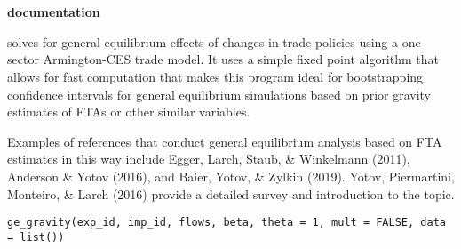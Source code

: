 \documentclass[a4paper]{book}
\begin{document}
\chapter*{}
\begin{center}
{\textbf{\huge \R{} documentation}} \par{}
\par\bigskip{\large \today}
\end{center}
%
\begin{Description}\relax
{} solves for general equilibrium effects of changes in trade policies
using a one sector Armington-CES trade model. It uses a simple fixed point
algorithm that allows for fast computation that makes this program
ideal for bootstrapping confidence intervals for general equilibrium simulations
based on prior gravity estimates of FTAs or other similar variables.

Examples of references that conduct general equilibrium analysis based on FTA
estimates in this way include Egger, Larch, Staub, \& Winkelmann (2011),
Anderson \& Yotov (2016), and Baier, Yotov, \& Zylkin (2019). Yotov, Piermartini,
Monteiro, \& Larch (2016) provide a detailed survey and introduction to the topic.
\end{Description}
%
\begin{Usage}
\begin{verbatim}
ge_gravity(exp_id, imp_id, flows, beta, theta = 1, mult = FALSE, data = list())
\end{verbatim}
\end{Usage}
%
\end{document}
